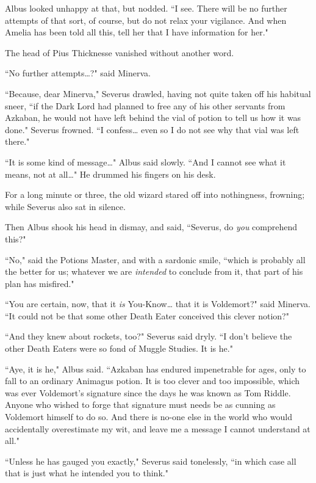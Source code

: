 Albus looked unhappy at that, but nodded. ``I see. There will be no further attempts of that sort, of course, but do not relax your vigilance. And when Amelia has been told all this, tell her that I have information for her."

The head of Pius Thicknesse vanished without another word.

``No further attempts{\ldots}?" said Minerva.

``Because, dear Minerva," Severus drawled, having not quite taken off his habitual sneer, ``if the Dark Lord had planned to free any of his other servants from Azkaban, he would not have left behind the vial of potion to tell us how it was done." Severus frowned. ``I confess{\ldots} even so I do not see why that vial was left there."

``It is some kind of message{\ldots}" Albus said slowly. ``And I cannot see what it means, not at all{\ldots}" He drummed his fingers on his desk.

For a long minute or three, the old wizard stared off into nothingness, frowning; while Severus also sat in silence.

Then Albus shook his head in dismay, and said, ``Severus, do \emph{you} comprehend this?"

``No," said the Potions Master, and with a sardonic smile, ``which is probably all the better for us; whatever we are \emph{intended} to conclude from it, that part of his plan has misfired."

``You are certain, now, that it \emph{is} You-Know{\ldots} that it is Voldemort?" said Minerva. ``It could not be that some other Death Eater conceived this clever notion?"

``And they knew about rockets, too?" Severus said dryly. ``I don't believe the other Death Eaters were so fond of Muggle Studies. It is he."

``Aye, it is he," Albus said. ``Azkaban has endured impenetrable for ages, only to fall to an ordinary Animagus potion. It is too clever and too impossible, which was ever Voldemort's signature since the days he was known as Tom Riddle. Anyone who wished to forge that signature must needs %
be as cunning as Voldemort himself to do so. And there is no-one else in the world who would accidentally overestimate my wit, and leave me a message I cannot understand at all."

``Unless he has gauged you exactly," Severus said tonelessly, ``in which case all that is just what he intended you to think."

